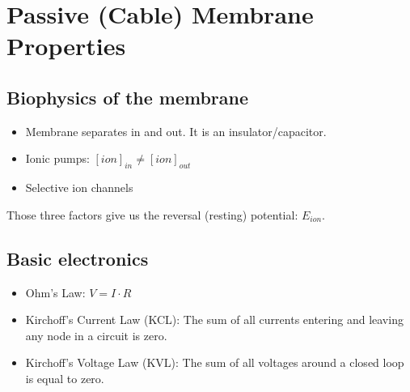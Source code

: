 \documentclass[main]{subfiles}
\begin{document}

\section{Passive (Cable) Membrane Properties}

\subsection{Biophysics of the membrane}
\begin{itemize}
\item Membrane separates in and out. It is an insulator/capacitor.
\item Ionic pumps: $[ion]_{in} \neq [ion]_{out}$
\item Selective ion channels
\end{itemize}

Those three factors give us the reversal (resting) potential: $E_{ion}$.

\subsection{Basic electronics}
\begin{itemize}[noitemsep,nolistsep]
	\item Ohm's Law: $V = I \cdot R$
	\item Kirchoff's Current Law (KCL): The sum of all currents entering and leaving any node in a circuit is zero.
	\item Kirchoff's Voltage Law (KVL): The sum of all voltages around a closed loop is equal to zero.
\end{itemize}
\end{document}
